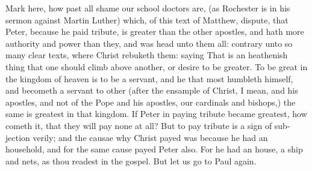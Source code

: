 \documentclass{custom}
\begin{document}
Mark here, how past all shame our school doctors are, 
(as Rochester is in his sermon against Martin Luther) 
which, of this text of Matthew, dispute, that Peter, because
he paid tribute, is greater than the other apostles, and hath
more authority and power than they, and was head unto 
them all: contrary unto so many clear texts, where Christ 
rebuketh them: saying That is an heathenish thing that one 
should climb above another, or desire to be greater. To be 
great in the kingdom of heaven is to be a servant, and he 
that most humbleth himself, and becometh a servant to 
other (after the ensample of Christ, I mean, and his apostles, 
and not of the Pope and his apostles, our cardinals and 
bishops,) the same is greatest in that kingdom. If Peter 
in paying tribute became greatest, how cometh it, that they 
will pay none at all? But to pay tribute is a sign of sub- 
jection verily; and the causae why Christ payed was because 
he had an household, and for the same cause payed Peter 
also. For he had an house, a ship and nets, as thou readest 
in the gospel. But let us go to Paul again. 
\end{document}

